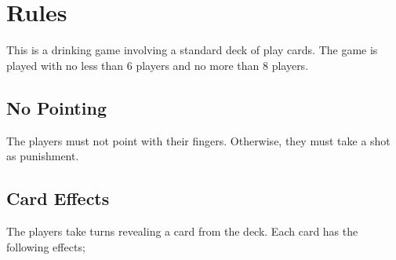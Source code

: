 \documentclass{article}
\begin{document}
\tableofcontents

\section{Rules}

This is a drinking game involving a standard deck of play cards. The game is played with no less than 6 players and no more than 8 players.

\subsection{No Pointing}

The players must not point with their fingers. Otherwise, they must take a shot as punishment.


\subsection{Card Effects}

The players take turns revealing a card from the deck. Each card has the following effects;
\end{document}
